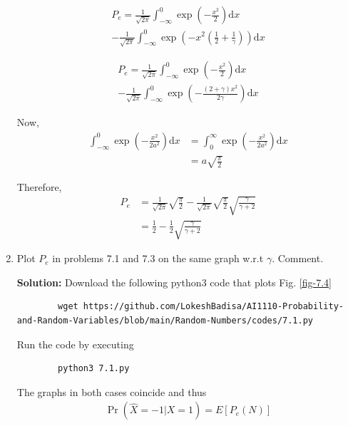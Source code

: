 \documentclass[journal,12pt,twocolumn]{IEEEtran}
\newcommand{\solution}{\noindent \textbf{Solution: }}
\providecommand{\pr}[1]{\ensuremath{\Pr\left(#1\right)}}
\providecommand{\brak}[1]{\ensuremath{\left(#1\right)}}
\providecommand{\mean}[1]{E\left[ #1 \right]}
\providecommand{\der}[1]{\mathrm{d} #1}
\numberwithin{equation}{section}
\renewcommand\thesection{\arabic{section}}
\begin{document}
\begin{enumerate}[label=\thesection.\arabic*,ref=\thesection.\theenumi]
	\begin{multline}
		P_e = \frac{1}{\sqrt{2\pi}} \int_{-\infty}^{0} \exp\brak{-\frac{x^2}{2}} \der{x} \\
		- \frac{1}{\sqrt{2\pi}} \int_{-\infty}^{0}  \exp\brak{-x^2\brak{\frac{1}{2} + \frac{1}{\gamma}}} \der{x}
	\end{multline}
	
	\begin{multline}
		P_e = \frac{1}{\sqrt{2\pi}} \int_{-\infty}^{0} \exp\brak{-\frac{x^2}{2}} \der{x} \\
		- \frac{1}{\sqrt{2\pi}} \int_{-\infty}^{0}  \exp\brak{-\frac{(2+\gamma) x^2}{2\gamma} } \der{x}
	\end{multline}
	
	Now,
	\begin{align}
		\int_{-\infty}^{0} \exp\brak{-\frac{x^2}{2a^2}} \der{x} &= \int_{0}^{\infty} \exp\brak{-\frac{x^2}{2a^2}} \der{x} \\
		 &= a \sqrt{\frac{\pi}{2}}
	\end{align}
	
	Therefore,
	\begin{align}
		P_e &= \frac{1}{\sqrt{2\pi}} \sqrt{\frac{\pi}{2}} - \frac{1}{\sqrt{2\pi}} \sqrt{\frac{\pi}{2}} \sqrt{\frac{\gamma}{\gamma+2}} \\
		&= \frac{1}{2} - \frac{1}{2} \sqrt{\frac{\gamma}{\gamma+2}}
	\end{align}
	
	\item Plot $P_e$ in problems 7.1 and 7.3 on the same graph w.r.t $\gamma$.  Comment.
	
	\solution Download the following python3 code that plots Fig. \ref{fig-7.4} 
	\begin{lstlisting}
		wget https://github.com/LokeshBadisa/AI1110-Probability-and-Random-Variables/blob/main/Random-Numbers/codes/7.1.py
	\end{lstlisting}
	Run the code by executing
	\begin{lstlisting}
		python3 7.1.py
	\end{lstlisting}
	
	The graphs in both cases coincide and thus
	\begin{align}
		\pr{\hat{X} = -1|X = 1} = \mean{P_e(N)}
	\end{align}
	

\end{enumerate}
\end{document}
